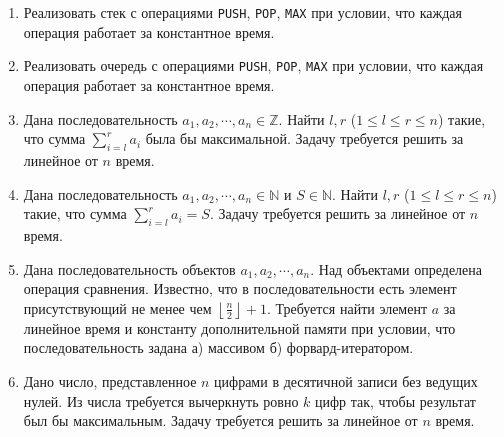 \section{}

\begin{enumerate}

  \item Реализовать стек с операциями \texttt{PUSH}, \texttt{POP}, \texttt{MAX}
        при условии, что каждая операция работает за константное время.

  \item Реализовать очередь с операциями \texttt{PUSH}, \texttt{POP}, \texttt{MAX}
        при условии, что каждая операция работает за константное время.

  \item Дана последовательность $a_1, a_2, \cdots, a_n \in \mathbb{Z}$.
        Найти $l, r$ ($1 \leq l \leq r \leq n$) такие, что сумма $\sum_{i = l}^r a_i$
        была бы максимальной. Задачу требуется решить за линейное от $n$ время.

  \item Дана последовательность $a_1, a_2, \cdots, a_n \in \mathbb{N}$ и $S \in \mathbb{N}$.
        Найти $l, r$ ($1 \leq l \leq r \leq n$) такие, что сумма $\sum_{i = l}^r a_i = S$.
        Задачу требуется решить за линейное от $n$ время.

  \item Дана последовательность объектов $a_1, a_2, \cdots, a_n$. Над объектами определена операция
        сравнения. Известно, что в последовательности есть элемент присутствующий не менее
        чем $\left\lfloor \frac{n}{2} \right\rfloor + 1$. Требуется найти элемент $a$ за линейное время
        и константу дополнительной памяти при условии, что последовательность задана а) массивом
        б) форвард-итератором.

  \item Дано число, представленное $n$ цифрами в десятичной записи без ведущих нулей.
      Из числа требуется вычеркнуть ровно $k$ цифр так, чтобы результат был бы максимальным.
      Задачу требуется решить за линейное от $n$ время.

\end{enumerate}
